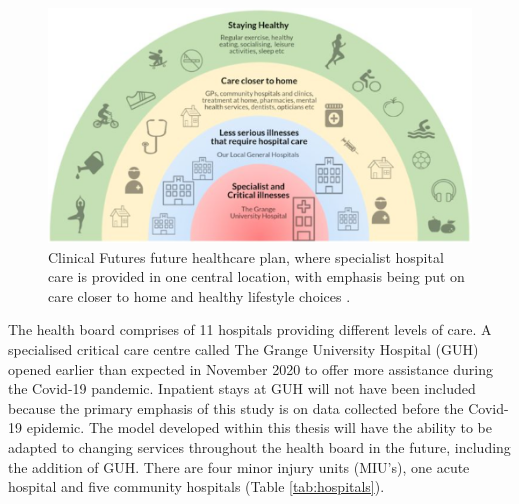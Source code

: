 \documentclass[../thesis.tex]{subfiles}
\begin{document}
\begin{figure}[h!]
    \centering
    \includegraphics[scale=0.8]{Chapters/Chapter1/Figures/Clinical Futures.png}
    \caption{Clinical Futures future healthcare plan, where specialist hospital care is provided in one central location, with emphasis being put on care closer to home and healthy lifestyle choices \cite{UniAneurinBevanHealthBoard2018}.}
    \label{fig:ClinicalFutures}
\end{figure}

The health board comprises of 11 hospitals providing different levels of care. A specialised critical care centre called The Grange University Hospital (GUH) opened earlier than expected in November 2020 to offer more assistance during the Covid-19 pandemic. Inpatient stays at GUH will not have been included because the primary emphasis of this study is on data collected before the Covid-19 epidemic. The model developed within this thesis will have the ability to be adapted to changing services throughout the health board in the future, including the addition of GUH.
There are four minor injury units (MIU's), one acute hospital and five community hospitals (Table \ref{tab:hospitals}).

\begin{table}[h!]
    \centering{}
    \caption{Type and names of the 11 hospitals located in ABUHB.}
    \label{tab:hospitals}
\end{table}
\end{document}
